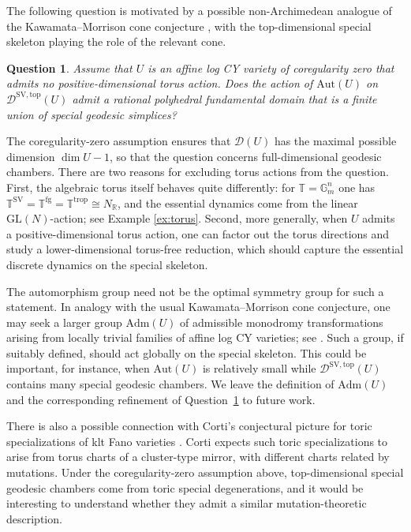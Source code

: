 \documentclass[reqno, 12pt]{amsart}
\newtheorem{que}[prop]{Question}
\theoremstyle{definition}
\newcommand{\bR}{\mathbb{R}}
\newcommand{\bG}{\mathbb{G}}
\newcommand{\bT}{\mathbb{T}}
\newcommand{\cD}{\mathcal{D}}
\newcommand{\Aut}{\mathrm{Aut}}
\newcommand{\trop}{\mathrm{trop}}
\newcommand{\GL}{\mathrm{GL}}
\newcommand{\SV}{\mathrm{SV}}
\newcommand{\rfg}{\mathrm{fg}}
\newcommand{\Adm}{\mathrm{Adm}}
\numberwithin{equation}{section}
\begin{document}
The following question is motivated by a possible non-Archimedean analogue
of the Kawamata--Morrison cone conjecture \cite{Mor93, Kaw97}, with the top-dimensional special skeleton
playing the role of the relevant cone.


\begin{que}\label{que:cone}
Assume that $U$ is an affine log CY variety of coregularity zero that admits no positive-dimensional torus action. Does the action of $\Aut(U)$ on $\cD^{\SV, \mathrm{top}}(U)$ admit a
rational polyhedral fundamental domain that is a finite union of special
geodesic simplices?
\end{que}

The coregularity-zero assumption ensures that $\cD(U)$ has the maximal
possible dimension $\dim U-1$, so that the question concerns
full-dimensional geodesic chambers.
There are two reasons for excluding torus actions from the question.
First, the algebraic torus itself behaves quite differently: for
$\bT=\bG_m^n$ one has
$\bT^{\SV}=\bT^{\rfg}=\bT^{\trop}\cong N_{\bR}$,
and the essential dynamics come from the linear $\GL(N)$-action; see Example \ref{ex:torus}.
Second, more generally, when $U$ admits a positive-dimensional torus
action, one can factor out the torus directions and
study a lower-dimensional torus-free reduction, which should capture the
essential discrete dynamics on the special skeleton.

The automorphism group need not be the optimal symmetry group for such a statement. In analogy with the usual Kawamata--Morrison cone conjecture, one may seek a larger group $\Adm(U)$ of admissible monodromy transformations arising from locally trivial families of affine log CY varieties; see \cite{GHK15, Li25}.
Such a group, if suitably defined, should act globally on the special
skeleton. This could be important, for instance, when $\Aut(U)$ is relatively small while
$\cD^{\SV,\mathrm{top}}(U)$ contains many special geodesic chambers. We leave the
definition of $\Adm(U)$ and the corresponding refinement of
Question~\ref{que:cone} to future work.


There is also a possible connection with Corti's conjectural picture for
toric specializations of klt Fano varieties \cite{Cor25}. Corti expects
such toric specializations to arise from torus charts of a cluster-type
mirror, with different charts related by mutations. Under the coregularity-zero assumption above,
top-dimensional special geodesic chambers come from toric special
degenerations, and it would be interesting to understand whether they
admit a similar mutation-theoretic description.
\end{document}
